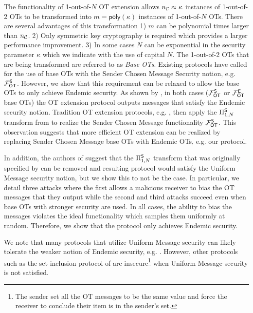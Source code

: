 The functionality of 1-out-of-$N$ OT extension allows ${n_\mathcal{C}}\approx\kappa$ instances of 1-out-of-2 OTs to be transformed into $m=\textsf{poly}(\kappa)$ instances of 1-out-of-$N$ OTs. There are several advantages of this transformation 1) $m$ can be polynomial times larger than ${n_\mathcal{C}}$. 2) Only symmetric key cryptography is required which provides a larger performance improvement. 3) In some cases $N$ can be exponential in the security parameter $\kappa$ which we indicate with the use of capital $N$. The 1-out-of-2 OTs that are being transformed are referred to as \emph{Base OTs}. Existing protocols \cite{C:IKNP03,EC:ALSZ15,C:KelOrsSch15,RSA:OrrOrsSch17} have called for the use of base OTs with the Sender Chosen Message Security notion, e.g. $\mathcal{F}_{\mathsf{OT}}^\mathsf{S}$. However, we show that this requirement can be relaxed to allow the base OTs to only achieve Endemic security. As shown by , in both cases ($\mathcal{F}_{\mathsf{OT}}^\mathsf{S}$ or $\mathcal{F}_{\mathsf{OT}}^\mathsf{E}$ base OTs) the OT extension protocol outputs messages that satisfy the Endemic security notion.  Tradition OT extension protocols, e.g. \cite{C:IKNP03,EC:ALSZ15,C:KelOrsSch15}, then apply the $\Pi^{\mathsf{S}}_{1,N}$ transform from  to realize the Sender Chosen Message functionality $\mathcal{F}_{\mathsf{OT}}^\mathsf{S}$. This observation suggests that more efficient OT extension can be realized by replacing Sender Chosen Message base OTs with Endemic OTs, e.g. our protocol.

In addition, the authors of \cite{C:KelOrsSch15,RSA:OrrOrsSch17} suggest that the $\Pi^{\mathsf{S}}_{1,N}$ transform that was originally specified by \cite{C:IKNP03} can be removed and resulting protocol would satisfy the Uniform Message security notion, but we show this to not be the case. In particular, we detail three attacks where the first  allows a malicious receiver to bias the OT messages that they output while the second and third attacks succeed even when base OTs with stronger security are used. In all cases, the ability to bias the messages violates the ideal functionality which samples them uniformly at random.
Therefore, we show that the protocol only achieves Endemic security.

We note that many protocols that utilize Uniform Message security can likely tolerate the weaker notion of Endemic security, e.g. \cite{EC:RinRos17,CCS:RinRos17}.  However, other protocols such as the set inclusion protocol of \cite[Figure 5]{RSA:OrrOrsSch17} are insecure\footnote{The sender set all the OT messages to be the same value and force the receiver to conclude their item is in the sender's set.} when Uniform Message security is not satisfied. 

